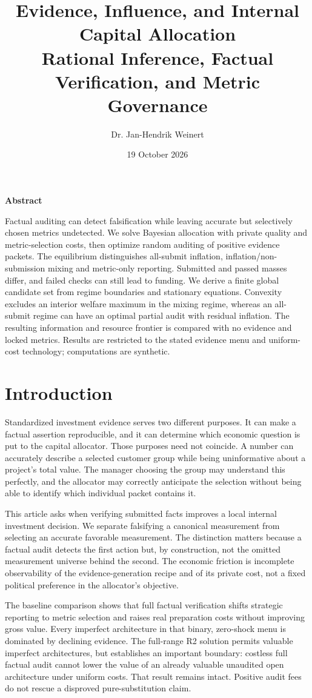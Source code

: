 \documentclass[11pt]{article}
\title{Evidence, Influence, and Internal Capital Allocation\\\large Rational Inference, Factual Verification, and Metric Governance}
\author{Dr. Jan-Hendrik Weinert}
\date{19 October 2026}
\makeatletter
\renewcommand{\maketitle}{%
  \begin{center}
  {\LARGE\bfseries\@title\par}
  \vspace{0.8em}
  {\normalsize\@author\par}
  \vspace{0.35em}
  {\small\@date\par}
  \end{center}
  \vspace{0.4em}}
\renewenvironment{abstract}{%
  \begin{center}\small\bfseries Abstract\end{center}
  \begin{list}{}{\setlength{\leftmargin}{0.5in}\setlength{\rightmargin}{0.5in}}
  \item[]\small\setlength{\parindent}{0pt}\ignorespaces
}{\end{list}\vspace{0.6em}}
\makeatother
\begin{document}
\maketitle
\begin{abstract}
Factual auditing can detect falsification while leaving accurate but selectively chosen metrics undetected. We solve Bayesian allocation with private quality and metric-selection costs, then optimize random auditing of positive evidence packets. The equilibrium distinguishes all-submit inflation, inflation/non-submission mixing and metric-only reporting. Submitted and passed masses differ, and failed checks can still lead to funding. We derive a finite global candidate set from regime boundaries and stationary equations. Convexity excludes an interior welfare maximum in the mixing regime, whereas an all-submit regime can have an optimal partial audit with residual inflation. The resulting information and resource frontier is compared with no evidence and locked metrics. Results are restricted to the stated evidence menu and uniform-cost technology; computations are synthetic.
\end{abstract}
\section{Introduction}\label{sec:intro}
Standardized investment evidence serves two different purposes. It can make a factual assertion reproducible, and it can determine which economic question is put to the capital allocator. Those purposes need not coincide. A number can accurately describe a selected customer group while being uninformative about a project's total value. The manager choosing the group may understand this perfectly, and the allocator may correctly anticipate the selection without being able to identify which individual packet contains it.

This article asks when verifying submitted facts improves a local internal investment decision. We separate falsifying a canonical measurement from selecting an accurate favorable measurement. The distinction matters because a factual audit detects the first action but, by construction, not the omitted measurement universe behind the second. The economic friction is incomplete observability of the evidence-generation recipe and of its private cost, not a fixed political preference in the allocator's objective.

The baseline comparison shows that full factual verification shifts strategic reporting to metric selection and raises real preparation costs without improving gross value. Every imperfect architecture in that binary, zero-shock menu is dominated by declining evidence. The full-range R2 solution permits valuable imperfect architectures, but establishes an important boundary: costless full factual audit cannot lower the value of an already valuable unaudited open architecture under uniform costs. That result remains intact. Positive audit fees do not rescue a disproved pure-substitution claim.
\end{document}
